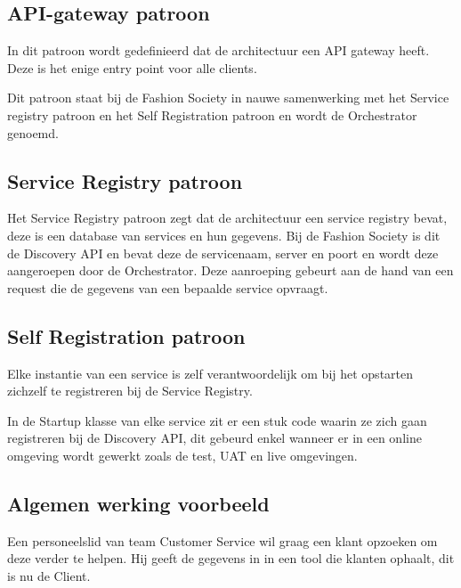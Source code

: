 \subsection{API-gateway patroon}
\label{subsec:API-gateway patroon}

 In dit patroon wordt gedefinieerd dat de architectuur een API gateway heeft. Deze is het enige entry point voor alle clients. \autocite{Richardsonb}
 
 Dit patroon staat bij de Fashion Society in nauwe samenwerking met het Service registry patroon en het Self Registration patroon en wordt de Orchestrator genoemd.
 
 \subsection{Service Registry patroon}
 \label{subsec:Service Registry patroon}
 
 Het Service Registry patroon zegt dat de architectuur een service registry bevat, deze is een database van services en hun gegevens. \autocite{Richardsona} Bij de Fashion Society is dit de Discovery API en bevat deze de servicenaam, server en poort en wordt deze aangeroepen door de Orchestrator. Deze aanroeping gebeurt aan de hand van een request die de gegevens van een bepaalde service opvraagt.
 
 \subsection{Self Registration patroon}
 \label{subsec:Self Registration patroon}
 
 Elke instantie van een service is zelf verantwoordelijk om bij het opstarten zichzelf te registreren bij de Service Registry. \autocite{Richardson}
 
 In de Startup klasse van elke service zit er een stuk code waarin ze zich gaan registreren bij de Discovery API, dit gebeurd enkel wanneer er in een online omgeving wordt gewerkt zoals de test, UAT en live omgevingen.
 
 \subsection{Algemen werking voorbeeld}
 \label{subsec:Algemene werking voorbeeld}
 
 Een personeelslid van team Customer Service wil graag een klant opzoeken om deze verder te helpen. Hij geeft de gegevens in in een tool die klanten ophaalt, dit is nu de Client. 
 
